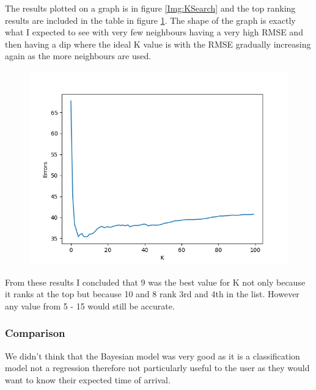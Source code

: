 \documentclass[11pt]{article}
\begin{document}
	The results plotted on a graph is in figure \ref{Img:KSearch} and the top ranking results are included in the table in figure \ref{Img:KSearchRaw}.	
	The shape of the graph is exactly what I expected to see with very few neighbours having a very high RMSE and then having a dip where the ideal K value is with the RMSE gradually increasing again as the more neighbours are used.
	
	\begin{figure}[!htb]
		\centering
		\begin{minipage}{.8\textwidth}
			\centering
			\includegraphics[width=.8\linewidth]{Resources/PartTwo/searchingForK_20220110_065714.png}
			\label{Img:KSearch}
		\end{minipage}%
		\begin{minipage}{.2\textwidth}
			\centering
			\label{Img:KSearchRaw}
		\end{minipage}
	\end{figure}
	
	From these results I concluded that 9 was the best value for K not only because it ranks at the top but because 10 and 8 rank 3rd and 4th in the list. However any value from 5 - 15 would still be accurate.
	\subsubsection{Comparison}
	We didn't think that the Bayesian model was very good as it is a classification model not a regression therefore not particularly useful to the user as they would want to know their expected time of arrival.
	
	
\end{document}
